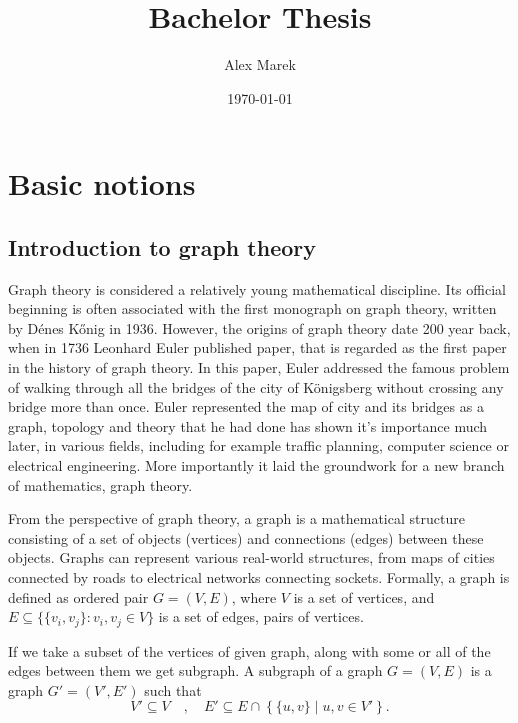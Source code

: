 \documentclass[12pt]{book}
\title{Bachelor Thesis}
\author{Alex Marek}
\date{\today}
\begin{document}
	
	\maketitle
	
	\chapter{Basic notions}
				
	\section{Introduction to graph theory}
		Graph theory is considered a relatively young mathematical discipline. Its official beginning is often associated with the first monograph on graph theory, written by Dénes Kőnig in 1936. However, the origins of graph theory date 200 year back, when in 1736 Leonhard Euler published paper, that is regarded as the first paper in the history of graph theory. In this paper, Euler addressed the famous problem of walking through all the bridges of the city of Königsberg without crossing any bridge more than once. Euler represented the map of city and its bridges as a graph, topology and theory that he had done has shown it's importance much later, in various fields, including for example traffic planning, computer science or electrical engineering. More importantly it laid the groundwork for a new branch of mathematics, graph theory.
		
		From the perspective of graph theory, a graph is a mathematical structure consisting of a set of objects (vertices) and connections (edges) between these objects.
 		Graphs can represent various real-world structures, from maps of cities connected by roads to electrical networks connecting sockets.
		Formally, a graph is defined as ordered pair \( G = (V, E) \), where \( V \) is a set of vertices, and \( E \subseteq \{\{v_i, v_j\} : v_i, v_j \in V\} \) is a set of edges, pairs of vertices.
		
		If we take a subset of the vertices of given graph, along with some or all of the edges between them we get subgraph. A subgraph of a graph \( G = (V, E) \) is a graph \( G' = (V', E') \) such that  
		\[
		V' \subseteq V \quad, \quad E' \subseteq E \cap \left\{ \{u,v\} \mid u,v \in V' \right\}.
		\]
			
\end{document}
